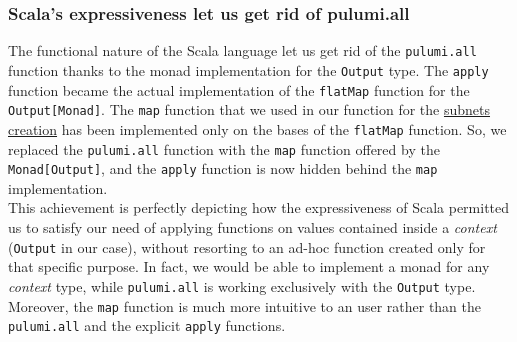 \subsubsection{Scala's expressiveness let us get rid of pulumi.all}
The functional nature of the Scala language let us get rid of the \texttt{pulumi.all} function thanks to the monad implementation for the \texttt{Output} type.
The \texttt{apply} function became the actual implementation of the \texttt{flatMap} function for the \texttt{Output[Monad]}.
The \texttt{map} function that we used in our function for the \hyperref[sssec:subnets-creation]{subnets creation} has been implemented only on the bases of the \texttt{flatMap} function.
So, we replaced the \texttt{pulumi.all} function with the \texttt{map} function offered by the \texttt{Monad[Output]}, and the \texttt{apply} function is now hidden behind the \texttt{map} implementation.\\
This achievement is perfectly depicting how the expressiveness of Scala permitted us to satisfy our need of applying functions on values contained inside a \textit{context} (\texttt{Output} in our case), without resorting to an ad-hoc function created only for that specific purpose.
In fact, we would be able to implement a monad for any \textit{context} type, while \texttt{pulumi.all} is working exclusively with the \texttt{Output} type.
Moreover, the \texttt{map} function is much more intuitive to an user rather than the \texttt{pulumi.all} and the explicit \texttt{apply} functions.







